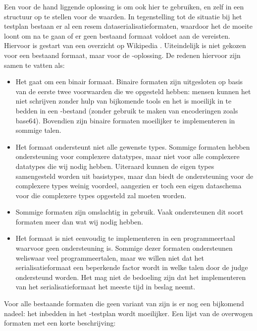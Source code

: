 Een voor de hand liggende oplossing is om ook hier  te gebruiken, en zelf in  een structuur op te stellen voor de waarden.
In tegenstelling tot de situatie bij het testplan bestaan er al een resem dataserialisatieformaten, waardoor het de moeite loont om na te gaan of er geen bestaand formaat voldoet aan de vereisten.
Hiervoor is gestart van een overzicht op Wikipedia \autocite{wiki2020}.
Uiteindelijk is niet gekozen voor een bestaand formaat, maar voor de -oplossing.
De redenen hiervoor zijn samen te vatten als:

\begin{itemize}
    \item Het gaat om een binair formaat.
    Binaire formaten zijn uitgesloten op basis van de eerste twee voorwaarden die we opgesteld hebben: mensen kunnen het niet schrijven zonder hulp van bijkomende tools en het is moeilijk in te bedden in een -bestand (zonder gebruik te maken van encoderingen zoals base64).
    Bovendien zijn binaire formaten moeilijker te implementeren in sommige talen.
    \item Het formaat ondersteunt niet alle gewenste types.
    Sommige formaten hebben ondersteuning voor complexere datatypes, maar niet voor alle complexere datatypes die wij nodig hebben.
    Uiteraard kunnen de eigen types samengesteld worden uit basistypes, maar dan biedt de ondersteuning voor de complexere types weinig voordeel, aangezien er toch een eigen dataschema voor die complexere types opgesteld zal moeten worden.
    \item Sommige formaten zijn omslachtig in gebruik.
    Vaak ondersteunen dit soort formaten meer dan wat wij nodig hebben.
    \item Het formaat is niet eenvoudig te implementeren in een programmeertaal waarvoor geen ondersteuning is.
    Sommige dezer formaten ondersteunen weliswaar veel programmeertalen, maar we willen niet dat het serialisatieformaat een beperkende factor wordt in welke talen door de judge ondersteund worden.
    Het mag niet de bedoeling zijn dat het implementeren van het serialisatieformaat het meeste tijd in beslag neemt.
\end{itemize}

Voor alle bestaande formaten die geen variant van  zijn is er nog een bijkomend nadeel: het inbedden in het -testplan wordt moeilijker.
Een lijst van de overwogen formaten met een korte beschrijving:

